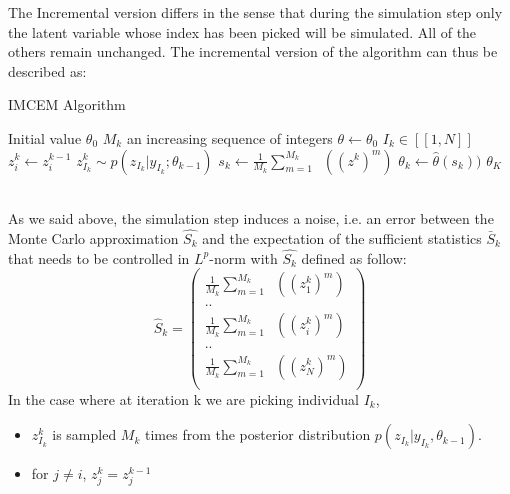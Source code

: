 \documentclass{article}
\theoremstyle{plain}
\DeclareMathOperator*{\St}{\tilde{S}}
\theoremstyle{plain}
\theoremstyle{definition}
\begin{document}
The Incremental version differs in the sense that during the simulation step only the latent variable whose index has been picked will be simulated. All of the others remain unchanged. The incremental version of the algorithm can thus be described as:
\begin{algorithm}
\caption{IMCEM Algorithm}
\label{pseudoIMCEM}
\begin{algorithmic}[1]
\State Initial value $\theta_0$
\State $M_k$ an increasing sequence of integers
\State $\theta \gets \theta_0$
\State $I_{k} \in [\![1,N]\!]$
        \State $z_i^{k} \gets z_i^{k-1}$
      \Else
        \State $z_{I_{k}}^{k} \sim p(z_{I_{k}}|y_{I_{k}}; \theta_{k-1})$
      \EndIf
        \State $s_{k} \gets \frac{1}{M_k}\sum_{m=1}^{M_k}{\St((z^{k})^m)}$
        \State $\theta_{k} \gets \hat{\theta}(s_{k}))$
\EndFor  
\State \Return $\theta_{K}$
\end{algorithmic}
\end{algorithm}
\\
As we said above, the simulation step induces a noise, i.e. an error between the Monte Carlo approximation $\hat{S_k}$ and the expectation of the sufficient statistics $\bar{S}_k$ that needs to be controlled in $L^p$-norm with $\hat{S_k}$ defined as follow:
\begin{equation}
\hat{S}_{k} = 
\left(
\begin{array}{c}
\frac{1}{M_{k}}\sum_{m=1}^{M_{k}}{\St((z_1^{k})^m)} \\
..\\
\frac{1}{M_{k}}\sum_{m=1}^{M_{k}}{\St((z_i^{k})^m)} \\
..\\
\frac{1}{M_{k}}\sum_{m=1}^{M_{k}}{\St((z_N^{k})^m)} \\
\end{array}
\right)
\end{equation}
In the case where at iteration k we are picking individual $I_{k}$, 
\begin{itemize}
\item $z_{I_{k}}^{k}$ is sampled $M_{k}$ times from the posterior distribution $p(z_{I_{k}}|y_{I_{k}},\theta_{k-1})$.
\item for $j \neq i$, $z_j^{k} = z_j^{k-1}$ 
\end{itemize}
\end{document}
